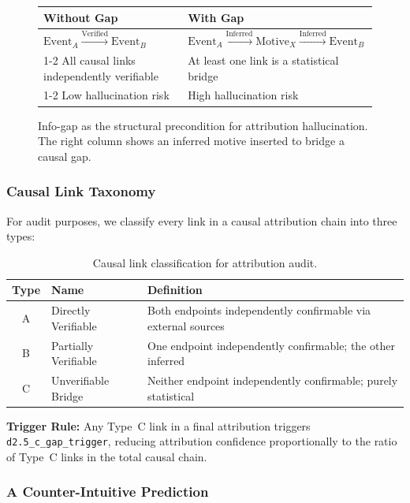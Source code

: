 \begin{figure}[ht]
\centering
\begin{tabular}{p{} p{}}
\toprule
\textbf{Without Gap} & \textbf{With Gap} \\
\midrule
$\text{Event}_A \xrightarrow{\text{Verified}} \text{Event}_B$ 
& $\text{Event}_A \xrightarrow{\text{Inferred}} \text{Motive}_X \xrightarrow{\text{Inferred}} \text{Event}_B$ \\
\cmidrule(lr){1-2}
All causal links independently verifiable 
& At least one link is a statistical bridge \\
\cmidrule(lr){1-2}
Low hallucination risk 
& High hallucination risk \\
\bottomrule
\end{tabular}
\caption{Info-gap as the structural precondition for attribution hallucination. 
The right column shows an inferred motive inserted to bridge a causal gap.}
\label{fig:info-gap}
\end{figure}

\subsubsection{Causal Link Taxonomy}

For audit purposes, we classify every link in a causal attribution chain into 
three types:

\begin{table}[ht]
\centering
\begin{tabular}{clp{}}
\toprule
\textbf{Type} & \textbf{Name} & \textbf{Definition} \\
\midrule
A & Directly Verifiable & Both endpoints independently confirmable via external sources \\
B & Partially Verifiable & One endpoint independently confirmable; the other inferred \\
C & Unverifiable Bridge & Neither endpoint independently confirmable; purely statistical \\
\bottomrule
\end{tabular}
\caption{Causal link classification for attribution audit.}
\label{tab:link-types}
\end{table}

\textbf{Trigger Rule:} Any Type~C link in a final attribution triggers 
\texttt{d2.5\_c\_gap\_trigger}, reducing attribution confidence proportionally 
to the ratio of Type~C links in the total causal chain.

\subsubsection{A Counter-Intuitive Prediction}

